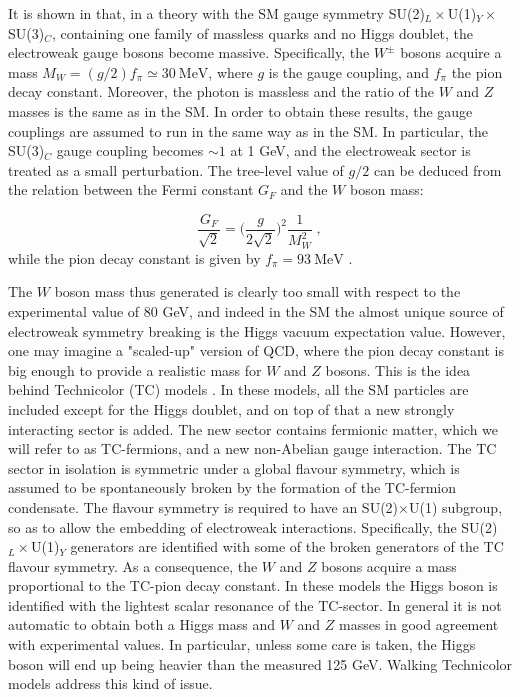 It is shown in \cite{Susskind:1978ms} that, in a theory with the SM gauge symmetry SU(2)$_L\times$U(1)$_Y\times$SU(3)$_C$, containing one family of massless quarks and no Higgs doublet, the electroweak gauge bosons become massive.
Specifically, the $W^{\pm}$ bosons acquire a mass $M_{W} = (g/2) f_{\pi} \simeq 30 \: \mathrm{MeV}$, where $g$ is the \suEW gauge coupling, and $f_{\pi}$ the pion decay constant. Moreover, the photon is massless and the ratio of the $W$ and $Z$ masses is the same as in the SM. In order to obtain these results, the gauge couplings are assumed to run in the same way as in the SM. In particular, the SU(3)$_C$ gauge coupling becomes $\sim 1$ at 1 GeV, and the electroweak sector is treated as a small perturbation. The tree-level value of $g/2$ can be deduced from the relation between the Fermi constant $G_F$ and the $W$ boson mass:

\begin{equation}
\frac{G_F}{\sqrt 2} = \biggl( \frac{g}{2 \sqrt 2} \biggr)^2 \frac{1}{M_W^2}  \; ,
\end{equation} 
%
while the pion decay constant is given by $f_{\pi} = 93 \: \mathrm{MeV}$ \cite{Peskin:1995ev}.

The $W$ boson mass thus generated is clearly too small with respect to the experimental value of 80 GeV, and indeed in the SM the almost unique source of electroweak symmetry breaking is the Higgs vacuum expectation value. However, one may imagine a "scaled-up" version of QCD, where the pion decay constant is big enough to provide a realistic mass for $W$ and $Z$ bosons. This is the idea behind Technicolor (TC) models \cite{Weinberg:1975gm,Susskind:1978ms}. In these models, all the SM particles are included except for the Higgs doublet, and on top of that a new strongly interacting sector is added. The new sector contains fermionic matter, which we will refer to as TC-fermions, and a new non-Abelian gauge interaction. The TC sector in isolation is symmetric under a global flavour symmetry, which is assumed to be spontaneously broken by the formation of the TC-fermion condensate. The flavour symmetry is required to have an SU(2)$\times$U(1) subgroup, so as to allow the embedding of electroweak interactions. Specifically, the SU(2)$_L\times$U(1)$_Y$ generators are identified with some of the broken generators of the TC flavour symmetry. As a consequence, the $W$ and $Z$ bosons acquire a mass proportional to the TC-pion decay constant. In these models the Higgs boson is identified with the lightest scalar resonance of the TC-sector. In general it is not automatic to obtain both a Higgs mass and $W$ and $Z$ masses in good agreement with experimental values. In particular, unless some care is taken, the Higgs boson will end up being heavier than the measured 125 GeV. Walking Technicolor models \cite{Holdom:1981rm,Yamawaki:1985zg,Dietrich:2005jn,Appelquist:2010gy} address this kind of issue.

